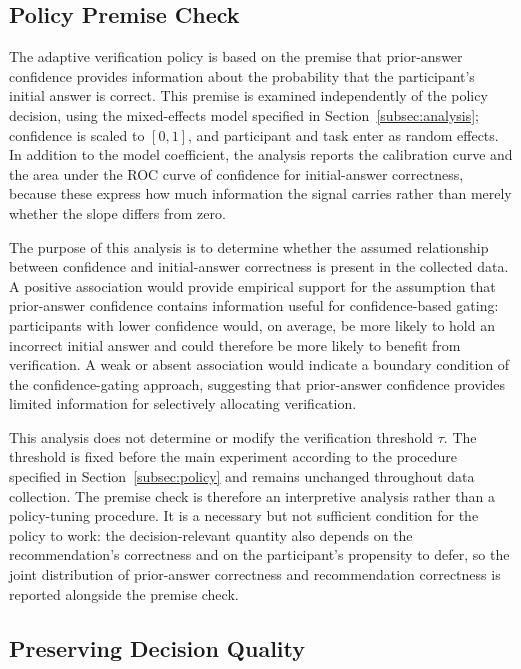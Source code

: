 \documentclass[oneside,final,14pt,a4paper]{extreport}
\begin{document}
\subsection{Policy Premise Check}
\label{subsec:premise}

The adaptive verification policy is based on the premise that prior-answer
confidence provides information about the probability that the participant's
initial answer is correct. This premise is examined independently of the
policy decision, using the mixed-effects model specified in
Section~\ref{subsec:analysis}; confidence is scaled to $[0,1]$, and
participant and task enter as random effects. In addition to the model
coefficient, the analysis reports the calibration curve and the area under
the ROC curve of confidence for initial-answer correctness, because these
express how much information the signal carries rather than merely whether
the slope differs from zero.

The purpose of this analysis is to determine whether the assumed relationship
between confidence and initial-answer correctness is present in the collected
data. A positive association would provide empirical support for the
assumption that prior-answer confidence contains information useful for
confidence-based gating: participants with lower confidence would, on
average, be more likely to hold an incorrect initial answer and could
therefore be more likely to benefit from verification. A weak or absent
association would indicate a boundary condition of the confidence-gating
approach, suggesting that prior-answer confidence provides limited information
for selectively allocating verification.

This analysis does not determine or modify the verification threshold $\tau$.
The threshold is fixed before the main experiment according to the procedure
specified in Section~\ref{subsec:policy} and remains unchanged throughout data
collection. The premise check is therefore an interpretive analysis rather
than a policy-tuning procedure. It is a necessary but not sufficient condition
for the policy to work: the decision-relevant quantity also depends on the
recommendation's correctness and on the participant's propensity to defer, so
the joint distribution of prior-answer correctness and recommendation
correctness is reported alongside the premise check.

\subsection{Preserving Decision Quality}
\label{subsec:quality}
\end{document}
